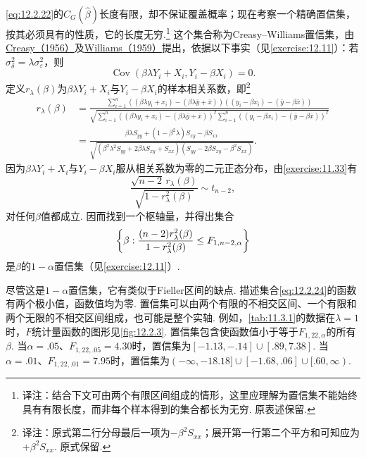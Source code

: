 \eqref{eq:12.2.22}的$C_G(\hat\beta)$长度有限，却不保证覆盖概率；现在考察一个精确置信集，按其必须具有的性质，它的长度无穷.\footnote{译注：结合下文可由两个有限区间组成的情形，这里应理解为置信集不能始终具有有限长度，而非每个样本得到的集合都长为无穷. 原表述保留.} 这个集合称为Creasy--Williams置信集，由\hyperref[bib:source87]{Creasy（1956）}及\hyperref[bib:source331]{Williams（1959）}提出，依据以下事实（见\autoref{exercise:12.11}）：若$\sigma_\delta^2=\lambda\sigma_\varepsilon^2$，则
$$\operatorname{Cov}(\beta\lambda Y_i+X_i,Y_i-\beta X_i)=0.$$
定义$r_\lambda(\beta)$为$\beta\lambda Y_i+X_i$与$Y_i-\beta X_i$的样本相关系数，即\footnote{译注：原式第二行分母最后一项为$-\beta^2S_{xx}$；展开第一行第二个平方和可知应为$+\beta^2S_{xx}$. 原式保留.}
\begin{equation}\label{eq:12.2.23}
\begin{aligned}
r_\lambda(\beta)
&=\frac{\sum_{i=1}^n((\beta\lambda y_i+x_i)-(\beta\lambda\bar y+\bar x))((y_i-\beta x_i)-(\bar y-\beta\bar x))}
{\sqrt{\sum_{i=1}^n((\beta\lambda y_i+x_i)-(\beta\lambda\bar y+\bar x))^2\sum_{i=1}^n((y_i-\beta x_i)-(\bar y-\beta\bar x))^2}}\\
&=\frac{\beta\lambda S_{yy}+(1-\beta^2\lambda)S_{xy}-\beta S_{xx}}
{\sqrt{(\beta^2\lambda^2S_{yy}+2\beta\lambda S_{xy}+S_{xx})(S_{yy}-2\beta S_{xy}-\beta^2S_{xx})}}.
\end{aligned}
\end{equation}
因为$\beta\lambda Y_i+X_i$与$Y_i-\beta X_i$服从相关系数为零的二元正态分布，由\autoref{exercise:11.33}有
$$\frac{\sqrt{n-2}\,r_\lambda(\beta)}{\sqrt{1-r_\lambda^2(\beta)}}\sim t_{n-2},$$
对任何$\beta$值都成立. 因而找到一个枢轴量，并得出集合
\begin{equation}\label{eq:12.2.24}\index{SI0186@变量含误差}
\left\{\beta:\frac{(n-2)r_\lambda^2(\beta)}{1-r_\lambda^2(\beta)}\le F_{1,n-2,\alpha}\right\}
\end{equation}
是$\beta$的$1-\alpha$置信集（见\autoref{exercise:12.11}）.

尽管这是$1-\alpha$置信集，它有类似于Fieller区间的缺点. 描述集合\eqref{eq:12.2.24}的函数有两个极小值，函数值均为零. 置信集可以由两个有限的不相交区间、一个有限和两个无限的不相交区间组成，也可能是整个实轴. 例如，\autoref{tab:11.3.1}的数据在$\lambda=1$时，$F$统计量函数的图形见\autoref{fig:12.2.3}. 置信集包含使函数值小于等于$F_{1,22,\alpha}$的所有$\beta$. 当$\alpha=.05$、$F_{1,22,.05}=4.30$时，置信集为$[-1.13,-.14]\cup[.89,7.38]$. 当$\alpha=.01$、$F_{1,22,.01}=7.95$时，置信集为$(-\infty,-18.18]\cup[-1.68,.06]\cup[.60,\infty)$.

